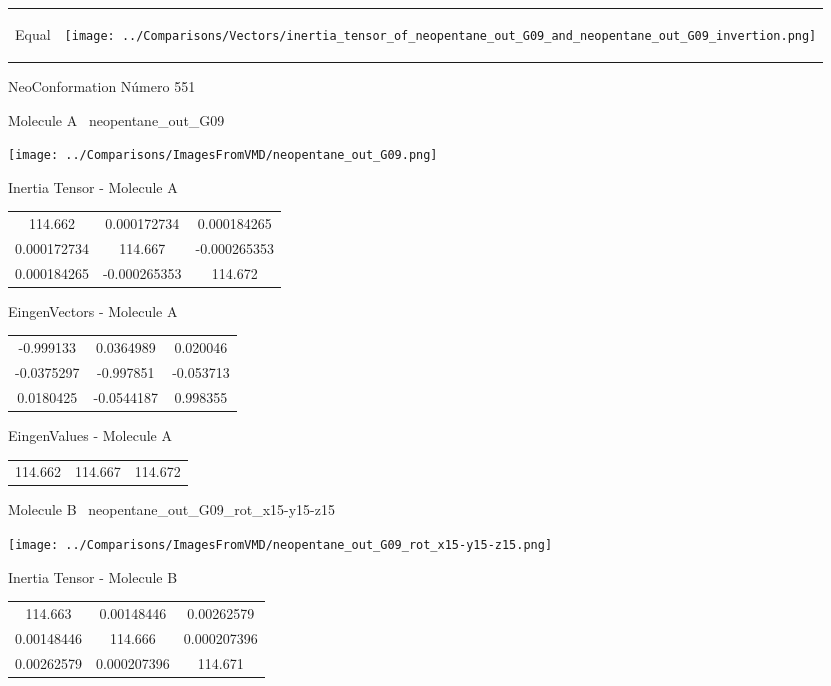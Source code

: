 \vtab[-5mm]
\begin{tabular}{*{2}{m{}}}
\begin{center}
\textcolor{NavyBlue}{\Large Equal}
\end{center}
&
\begin{center}
\texttt{[image: ../Comparisons/Vectors/inertia\_tensor\_of\_neopentane\_out\_G09\_and\_neopentane\_out\_G09\_invertion.png]}
\end{center}
\end{tabular}

 \newpage

\vtab[-3cm]
\begin{center}
{\large NeoConformation \tab Número 551}
\end{center}
\begin{multicols}{2}
\begin{center}

Molecule A \
neopentane\_out\_G09

\texttt{[image: ../Comparisons/ImagesFromVMD/neopentane\_out\_G09.png]}

Inertia Tensor - Molecule A \\
\begin{tabular}{|c c c|}
114.662	 & 	0.000172734	 & 	0.000184265	 \\
0.000172734	 & 	114.667	 & 	-0.000265353	 \\
0.000184265	 & 	-0.000265353	 & 	114.672
\end{tabular}

\vtab
 EingenVectors - Molecule A     \\
\begin{tabular}{|c c c|}
-0.999133	 & 	0.0364989	 & 	0.020046	 \\
-0.0375297	 & 	-0.997851	 & 	-0.053713	 \\
0.0180425	 & 	-0.0544187	 & 	0.998355
\end{tabular}

\vtab
 EingenValues - Molecule A     \\
\begin{tabular}{|c c c|}
114.662	 & 	114.667	 & 	114.672	 \\
\end{tabular}
\columnbreak

Molecule B \
neopentane\_out\_G09\_rot\_x15-y15-z15

\texttt{[image: ../Comparisons/ImagesFromVMD/neopentane\_out\_G09\_rot\_x15-y15-z15.png]}

Inertia Tensor - Molecule B \\
\begin{tabular}{|c c c|}
114.663	 & 	0.00148446	 & 	0.00262579	 \\
0.00148446	 & 	114.666	 & 	0.000207396	 \\
0.00262579	 & 	0.000207396	 & 	114.671
\end{tabular}


\end{center}
\end{multicols}
